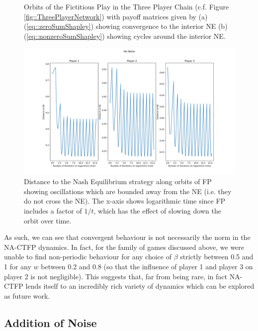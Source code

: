 \documentclass{article}
\theoremstyle{definition}
\begin{document}
\begin{figure}[t]
\begin{subfigure}[b]{0.45 \textwidth}
      \caption{\label{fig::nonconvergentShapley}}
    \end{subfigure}
    \caption{\label{fig::Shapley} Orbits of the Fictitious Play in the Three Player Chain (c.f.
    Figure \ref{fig::ThreePlayerNetwork}) with payoff matrices given by (a)
    (\ref{eq::zeroSumShapley}) showing convergence to the interior NE (b)
    (\ref{eq::nonzeroSumShapley}) showing cycles around the interior NE.}
  \end{figure}


  \begin{figure}[t]
    \centering
    \includegraphics[width = 0.7 \textwidth]{Figures/3PlayerChainNoNoise.png}
    \caption{\label{fig::3PlayerChainNoNoise} Distance to the Nash Equilibrium strategy along orbits
    of FP showing oscillations which are bounded away from the NE (i.e. they do not cross the NE).
    The x-axis shows logarithmic time since FP includes a factor of $1/t$, which has the effect of
    slowing down the orbit over time.}
  \end{figure}

  As such, we can see that convergent behaviour is not necessarily the norm in the NA-CTFP dynamics. In fact, for the family of games discussed above, we were unable to find non-periodic behaviour for any choice of $\beta$ strictly between 0.5 and 1 for any $w$ between 0.2 and 0.8 (so that the influence of player 1 and player 3 on player 2 is not negligible). This suggests that, far from being rare, in fact NA-CTFP lends itself to an incredibly rich variety of dynamics which can be explored as future work.
  

  \subsection{Addition of Noise}
\end{document}
